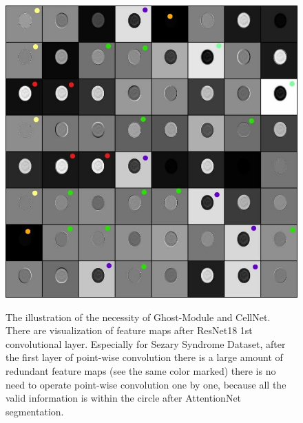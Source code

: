 \begin{figure}[t]
\begin{center}
\includegraphics[height=0.33\textheight]{thesis-template-master/images/cellnetnecc3.jpg}
\label{fig:cellnet}
\end{center}
\caption{The illustration of the necessity of Ghost-Module and CellNet. There are visualization of feature maps after ResNet18\cite{20} 1st convolutional layer. Especially for Sezary Syndrome Dataset, after the first layer of point-wise convolution there is a large amount of redundant feature maps (see the same color marked) there is no need to operate point-wise convolution one by one, because all the valid information is within the circle after AttentionNet segmentation.}
\end{figure}

